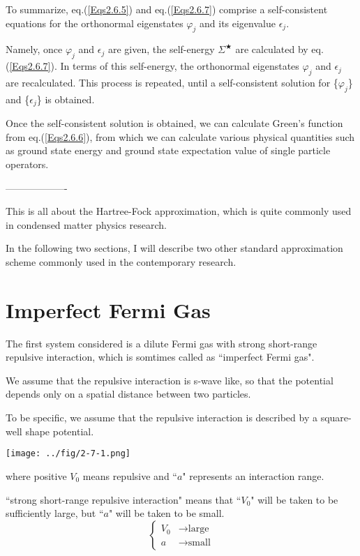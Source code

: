 To summarize, eq.(\ref{Eqs2.6.5}) and eq.(\ref{Eqs2.6.7}) comprise a self-consistent equations for the orthonormal eigenstates $\varphi_j$ and its eigenvalue $\epsilon_j$.

Namely, once  $\varphi_j$ and $\epsilon_j$ are given, the self-energy $\Sigma^\bigstar$ are calculated by eq.(\ref{Eqs2.6.7}). In terms of this self-energy, the orthonormal eigenstates $\varphi_j$ and $\epsilon_j$ are recalculated. This process is repeated, until a self-consistent solution for \{$\varphi_j$\} and \{$\epsilon_j$\} is obtained.

Once the self-consistent solution is obtained, we can calculate Green's function from eq.(\ref{Eqs2.6.6}), from which we can calculate various physical quantities such as ground state energy and ground state expectation value of single particle operators.
\begin{center}-------------------\end{center}

This is all about the Hartree-Fock approximation, which is quite commonly used in condensed matter physics research.

In the following two sections, I will describe two other standard approximation scheme commonly used in the contemporary research.

\section{Imperfect Fermi Gas}%
The first system considered is a dilute Fermi gas with strong short-range repulsive interaction, which is somtimes called as ``imperfect Fermi gas".

We assume that the repulsive interaction is s-wave like, so that the potential depends only on a spatial distance between two particles.

To be specific, we assume that the repulsive interaction is described by a square-well shape potential.
\begin{center} \label{Fig2.7.1} \texttt{[image: ../fig/2-7-1.png]}
\end{center}
where positive $V_0$ means repulsive and ``$a$" represents an interaction range.

``strong short-range repulsive interaction" means that ``$V_0$" will be taken to be sufficiently large, but ``$a$" will be taken to be small.
\[ \left \{ \begin{split} V_0 &\rightarrow \text{large} \\ a &\rightarrow \text{small} \end{split} \right. \]


